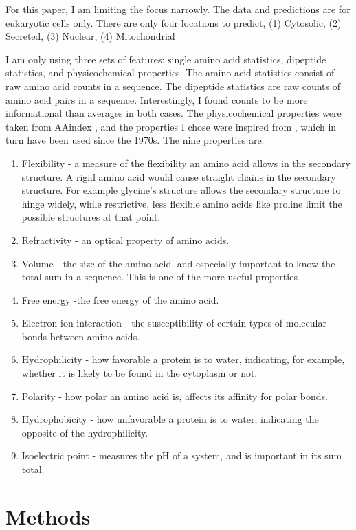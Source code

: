 \documentclass{bioinfo}
\begin{document}
For this paper, I am limiting the focus narrowly.
The data and predictions are for eukaryotic cells only.
There are only four locations to predict, (1) Cytosolic, (2) Secreted, (3) Nuclear, (4) Mitochondrial

I am only using three sets of features: single amino acid statistics, dipeptide statistics, and physicochemical properties.
The amino acid statistics consist of raw amino acid counts in a sequence.
The dipeptide statistics are raw counts of amino acid pairs in a sequence.
Interestingly, I found counts to be more informational than averages in both cases.
The physicochemical properties were taken from AAindex \citep{genomenet_aaindex_2017}, and the properties I chose were inspired from \citep{gao_prediction_2005}, which in turn have been used since the 1970s.
The nine properties are:
\begin{enumerate}[(1)]
  \item
    Flexibility - a measure of the flexibility an amino acid allows in the secondary structure. A rigid amino acid would cause straight chains in the secondary structure. For example glycine's structure allows the secondary structure to hinge widely, while restrictive, less flexible amino acids like proline limit the possible structures at that point.
  \item
    Refractivity - an optical property of amino acids.
  \item
    Volume - the size of the amino acid, and especially important to know the total sum in a sequence. This is one of the more useful properties
  \item
    Free energy -the free energy of the amino acid.
  \item
    Electron ion interaction - the susceptibility of certain types of molecular bonds between amino acids.
  \item
    Hydrophilicity - how favorable a protein is to water, indicating, for example, whether it is likely to be found in the cytoplasm or not.
  \item
    Polarity - how polar an amino acid is, affects its affinity for polar bonds.
  \item
    Hydrophobicity - how unfavorable a protein is to water, indicating the opposite of the hydrophilicity.
  \item
    Isoelectric point - measures the pH of a system, and is important in its sum total.
\end{enumerate}

\section{Methods}
\end{document}
